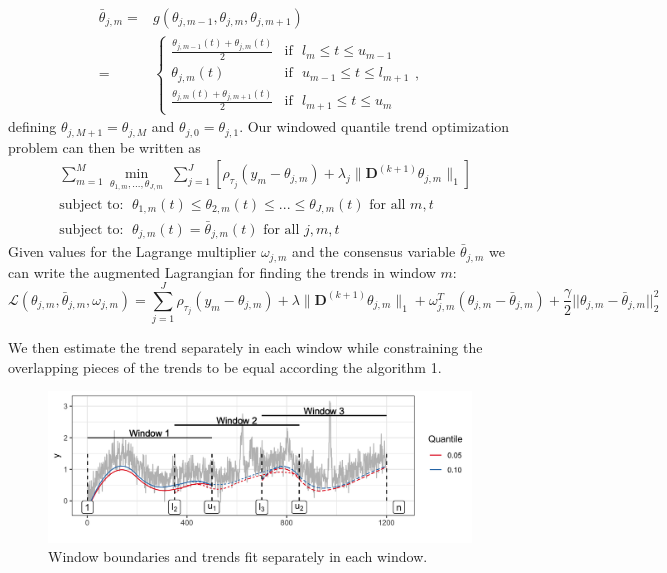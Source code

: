 \documentclass[12pt]{article}
\begin{document}
	 \begin{align}
		 \bar{\theta}_{j,m} =&  g(\theta_{j, m-1}, \theta_{j,m}, \theta_{j,m+1}) \\
		 =& \begin{cases} 
			 \frac{\theta_{j,m-1}(t)+\theta_{j,m}(t)}{2} & \mbox{if~~} l_{m} \le t \le u_{m-1}  \\
			 \theta_{j,m}(t) & \mbox{if~~} u_{m-1} \le t \le l_{m+1}  \\
			 \frac{\theta_{j,m}(t)+\theta_{j,m+1}(t)}{2} & \mbox{if~~} l_{m+1} \le t \le u_{m}  
			 \end{cases},
	\end{align}
	defining $\theta_{j,M+1} = \theta_{j,M}$ and $\theta_{j,0} = \theta_{j,1}$. Our windowed quantile trend optimization problem can then be written as 
	 \begin{align}
		 \label{eq:quantile_windows}
		 &\sum_{m=1}^M\underset{\theta_{1,m}, ..., \theta_{J,m}}{\min}\; \sum_{j=1}^J \left [\rho_{\tau_j}(y_m - \theta_{j,m}) + 
		 \lambda_j \lVert \mathbf{D}^{(k+1)} \theta_{j,m} \rVert_1 \right ] \\
		 &\text{subject to: }\; \theta_{1,m}(t) \le \theta_{2,m}(t) \le ... \le \theta_{J,m}(t) \text{ for all } m,t \\
		 &\text{subject to: }\; \theta_{j,m}(t) = \bar{\theta}_{j,m}(t) \text{ for all } j, m, t
	 \end{align}
	 Given values for the Lagrange multiplier $\omega_{j,m}$ and the consensus variable $\bar{\theta}_{j,m}$ we can write the augmented Lagrangian for finding the trends in window $m$:
	 \begin{equation}
	 \mathcal{L}(\theta_{j,m}, \bar{\theta}_{j,m}, \omega_{j,m}) = \sum_{j=1}^J\rho_{\tau_j}(y_m - \theta_{j,m})+\lambda \lVert \mathbf{D}^{(k+1)}\theta_{j,m}\rVert_1 +  \omega_{j,m}^T(\theta_{j,m} - \bar{\theta}_{j,m}) + 
	 \frac{\gamma}{2}||\theta_{j,m} - \bar{\theta}_{j,m}||_2^2
	 \end{equation}
	 
	 We then estimate the trend separately in each window while constraining the overlapping pieces of the trends to be equal according the algorithm 1. 
	 
	\begin{figure}[!h] 
		\centering
		\caption{Window boundaries and trends fit separately in each window.}
		\includegraphics[width = 0.8\linewidth]{Figures/overlapping_windows.png}
	\end{figure}
\end{document}
